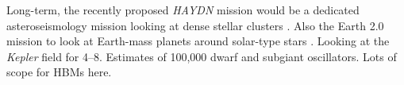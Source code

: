 Long-term, the recently proposed \emph{HAYDN} mission would be a dedicated asteroseismology mission looking at dense stellar clusters \citep{Miglio.Girardi.ea2021}. Also the Earth 2.0 mission to look at Earth-mass planets around solar-type stars \citep{Ge.Zhang.ea2022}. Looking at the \emph{Kepler} field for \SIrange{4}{8}{\year}. Estimates of 100,000 dwarf and subgiant oscillators. Lots of scope for HBMs here.
